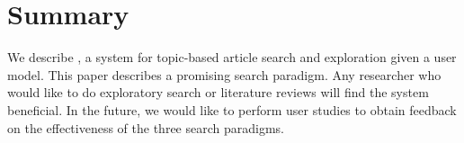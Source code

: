 
\section{Summary}
\label{sec:summary}

We describe \system, a system for topic-based article search
and exploration given a user model.
This paper describes a promising search paradigm.
Any researcher who would like to do exploratory search or literature 
reviews will find the system beneficial. In the future, 
we would like to perform user studies to obtain feedback on the 
effectiveness of the three search paradigms.

